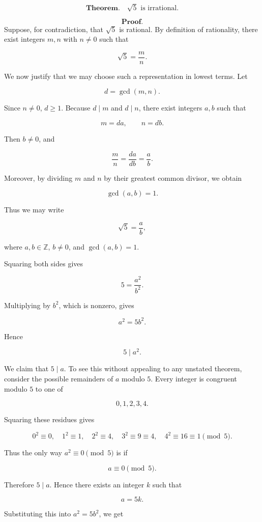 \[
\textbf{Theorem.}\quad \sqrt{5}\text{ is irrational.}
\]

\[
\textbf{Proof.}
\]
Suppose, for contradiction, that \(\sqrt{5}\) is rational. By definition of rationality, there exist integers \(m,n\) with \(n\neq 0\) such that

\[
\sqrt{5}=\frac{m}{n}.
\]

We now justify that we may choose such a representation in lowest terms. Let

\[
d=\gcd(m,n).
\]

Since \(n\neq 0\), \(d\ge 1\). Because \(d\mid m\) and \(d\mid n\), there exist integers \(a,b\) such that

\[
m=da,\qquad n=db.
\]

Then \(b\neq 0\), and

\[
\frac{m}{n}=\frac{da}{db}=\frac{a}{b}.
\]

Moreover, by dividing \(m\) and \(n\) by their greatest common divisor, we obtain

\[
\gcd(a,b)=1.
\]

Thus we may write

\[
\sqrt{5}=\frac{a}{b},
\]

where \(a,b\in \mathbb{Z}\), \(b\neq 0\), and \(\gcd(a,b)=1\).

Squaring both sides gives

\[
5=\frac{a^2}{b^2}.
\]

Multiplying by \(b^2\), which is nonzero, gives

\[
a^2=5b^2.
\]

Hence

\[
5\mid a^2.
\]

We claim that \(5\mid a\). To see this without appealing to any unstated theorem, consider the possible remainders of \(a\) modulo \(5\). Every integer is congruent modulo \(5\) to one of

\[
0,1,2,3,4.
\]

Squaring these residues gives

\[
0^2\equiv 0,\quad 1^2\equiv 1,\quad 2^2\equiv 4,\quad 3^2\equiv 9\equiv 4,\quad 4^2\equiv 16\equiv 1 \pmod 5.
\]

Thus the only way \(a^2\equiv 0\pmod 5\) is if

\[
a\equiv 0\pmod 5.
\]

Therefore \(5\mid a\). Hence there exists an integer \(k\) such that

\[
a=5k.
\]

Substituting this into \(a^2=5b^2\), we get

